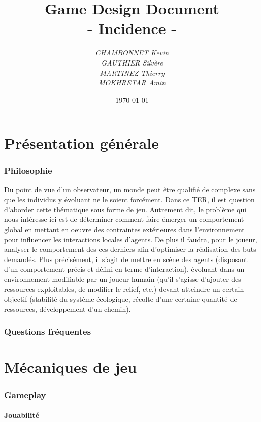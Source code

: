 \documentclass[a4paper]{article}
\title{\textbf{Game Design Document}\\- \Huge{Incidence} -}
\author{\emph{CHAMBONNET Kevin}\\\emph{GAUTHIER Silvère}\\\emph{MARTINEZ Thierry}\\\emph{MOKHRETAR Amin}}
\date{\today}
\begin{document}
  \maketitle
  \newpage


  \part{Présentation générale}
    \section{Philosophie}

      Du point de vue d’un observateur, un monde peut être qualifié de complexe sans que les individus y évoluant ne le soient forcément. Dans ce TER, il est question d’aborder cette thématique sous forme de jeu. Autrement dit, le problème qui nous intéresse ici est de déterminer comment faire émerger un comportement global en mettant en oeuvre des contraintes extérieures dans l’environnement pour influencer les interactions locales d’agents. De plus il faudra, pour le joueur, analyser le comportement des ces derniers afin d’optimiser la réalisation des buts demandés. Plus précisément, il s’agit de mettre en scène des agents (disposant d’un comportement précis et défini en terme d’interaction), évoluant dans un environnement modifiable par un joueur humain (qu’il s’agisse d’ajouter des ressources exploitables, de modifier le relief, etc.) devant atteindre un certain objectif (stabilité du système écologique, récolte d’une certaine quantité de ressources, développement d’un chemin).

    \section{Questions fréquentes}

  \part{Mécaniques de jeu}
    \section{Gameplay}
      \subsection{Jouabilité}
\end{document}
